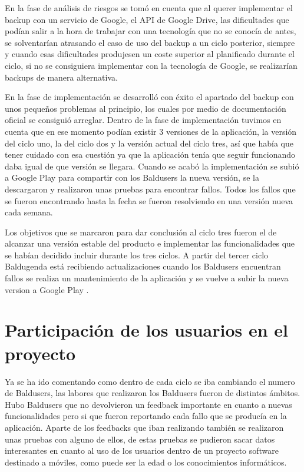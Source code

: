 En la fase de análisis de riesgos se tomó en cuenta que al querer implementar el backup con un servicio de Google, el API de Google Drive,  las dificultades que podían salir a la hora de trabajar con una tecnología que no se conocía de antes, se solventarían atrasando el caso de uso del backup a un ciclo posterior, siempre y cuando esas dificultades produjesen un coste superior al planificado durante el ciclo, si no se consiguiera implementar con la tecnología de Google, se realizarían backups de manera alternativa.

En la fase de implementación se desarrolló con éxito el apartado del backup con unos pequeños problemas al principio, los cuales por medio de documentación oficial se consiguió arreglar. Dentro de la fase de implementación tuvimos en cuenta que en ese momento podían existir 3 versiones de la aplicación, la versión del ciclo uno, la del ciclo dos y la versión actual del ciclo tres, así que había que tener cuidado con esa cuestión ya que la aplicación tenía que seguir funcionando daba igual de que versión se llegara. Cuando se acabó la implementación se subió a Google Play para compartir con los Baldusers la nueva versión, se la descargaron y realizaron unas pruebas para encontrar fallos. Todos los fallos que se fueron encontrando hasta la fecha se fueron resolviendo en una versión nueva cada semana.

Los objetivos que se marcaron para dar conclusión al ciclo tres fueron el de alcanzar una versión estable del producto e implementar las funcionalidades que se habían decidido incluir durante los tres ciclos. A partir del tercer ciclo Baldugenda está recibiendo actualizaciones cuando los Baldusers encuentran fallos se realiza un mantenimiento de la aplicación y se vuelve a subir la nueva version a Google Play . 
\newpage
\section{Participación de los usuarios en el proyecto}
\label{secc:Participación de los usuarios en el proyecto}

Ya se ha ido comentando como dentro de cada ciclo se iba cambiando el numero de Baldusers, las labores que realizaron los Baldusers fueron de distintos ámbitos. Hubo Baldusers que no devolvieron un feedback importante en cuanto a nuevas funcionalidades pero si que fueron reportando cada fallo que se producía en la aplicación. 
Aparte de los feedbacks que iban realizando también se realizaron unas pruebas con alguno de ellos, de estas pruebas se pudieron sacar datos interesantes en cuanto al uso de los usuarios dentro de un proyecto software destinado a móviles, como puede ser la edad o los conocimientos informáticos.

